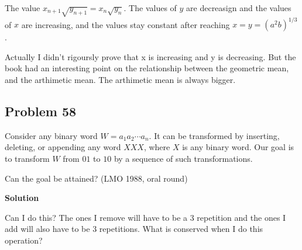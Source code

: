 \documentclass[12pt,tikz,border=10pt]{article}
\theoremstyle{definition}
\theoremstyle{remark}
\begin{document}
The value $x_{n+1}\sqrt{y_{n+1}}=x_{n}\sqrt{y_{n}}$.
The values of $y$ are decreasign and the values of $x$ are increasing, and  the values stay constant 
after reaching $x=y=(a^2 b)^{1/3}$.

Actually I didn't rigoursly prove that x is increasing and y is decreasing. But the book had an interesting 
point on the relationship between the geometric mean, and the arthimetic mean. The arthimetic mean is always bigger.

\subsection{Problem 58}


Consider any binary word \( W = a_1 a_2 \cdots a_n \). It can be transformed by inserting, deleting, or appending any word \( XXX \), where \( X \) is any binary word. Our goal is to transform \( W \) from \( 01 \) to \( 10 \) by a sequence of such transformations. 

Can the goal be attained? (LMO 1988, oral round)

\textbf{Solution}

Can I do this? The ones I remove will have to be a 3 repetition and the ones I add will also have to be 3 repetitions.
What is conserved when I do this operation?
\end{document}
